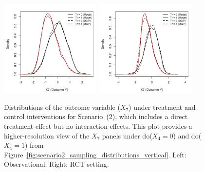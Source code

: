 \begin{figure}[htbp]
\centering
\includegraphics[width=0.45\textwidth]{img/results/observ_scenario2_X7_treatment_densities.png}
\includegraphics[width=0.45\textwidth]{img/results/rct_scenario2_X7_treatment_densities.png}
\caption{Distributions of the outcome variable ($X_7$) under treatment and control interventions for Scenario~(2), which includes a direct treatment effect but no interaction effects. This plot provides a higher-resolution view of the $X_7$ panels under do($X_4 = 0$) and do($X_4 = 1$) from Figure~\ref{fig:scenario2_sampling_distributions_vertical}. Left: Observational; Right: RCT setting.}
\label{fig:scenario2_outcome_distributions}
\end{figure}







